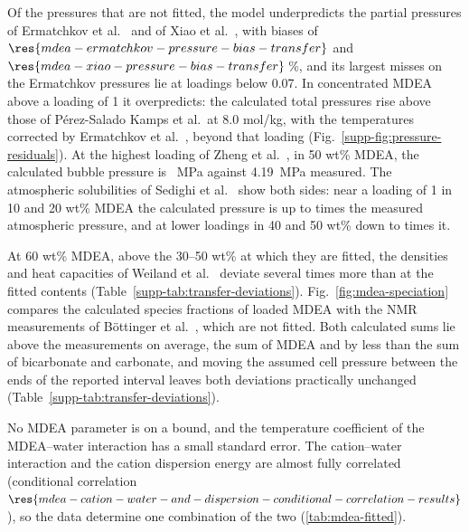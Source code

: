 

Of the pressures that are not fitted, the model underpredicts the \COtwo partial pressures of Ermatchkov et al.\ \cite{ermatchkovSolubilityCarbonDioxide2006} and of Xiao et al.\ \cite{xiaoCO2AbsorptionAqueous2018a}, with biases of $\res{mdea-ermatchkov-pressure-bias-transfer}$ and $\res{mdea-xiao-pressure-bias-transfer}$\,\%, and its largest misses on the Ermatchkov pressures lie at loadings below 0.07.
In concentrated MDEA above a loading of 1 it overpredicts: the calculated total pressures rise above those of P\'erez-Salado Kamps et al.\ at 8.0 mol/kg, with the temperatures corrected by Ermatchkov et al.\ \cite{ermatchkovSolubilityCarbonDioxide2006}, beyond that loading (Fig.~\ref{supp-fig:pressure-residuals}).
At the highest loading of Zheng et al.\ \cite{zhengCO2HeatAbsorption2020}, in 50 wt\% MDEA, the calculated bubble pressure is ~MPa against \SI{4.19}{\mega\pascal} measured.
The atmospheric solubilities of Sedighi et al.\ \cite{sedighiExperimentalMeasurementThermodynamic2024} show both sides: near a loading of 1 in 10 and 20 wt\% MDEA the calculated pressure is up to  times the measured atmospheric pressure, and at lower loadings in 40 and 50 wt\% down to  times it.

At 60 wt\% MDEA, above the 30--50 wt\% at which they are fitted, the densities and heat capacities of Weiland et al.\ \cite{Weiland1998,weilandHeatCapacityAqueous1997} deviate several times more than at the fitted contents (Table~\ref{supp-tab:transfer-deviations}).
Fig.~\ref{fig:mdea-speciation} compares the calculated species fractions of loaded MDEA with the NMR measurements of B\"ottinger et al.\ \cite{bottingerOnlineNMRSpectroscopic2008}, which are not fitted.
Both calculated sums lie above the measurements on average, the sum of MDEA and  by less than the sum of bicarbonate and carbonate, and moving the assumed cell pressure between the ends of the reported interval leaves both deviations practically unchanged (Table~\ref{supp-tab:transfer-deviations}).

No MDEA parameter is on a bound, and the temperature coefficient of the MDEA--water interaction has a small standard error.
The cation--water interaction and the cation dispersion energy are almost fully correlated (conditional correlation $\res{mdea-cation-water-and-dispersion-conditional-correlation-results}$), so the data determine one combination of the two (\cref{tab:mdea-fitted}).

